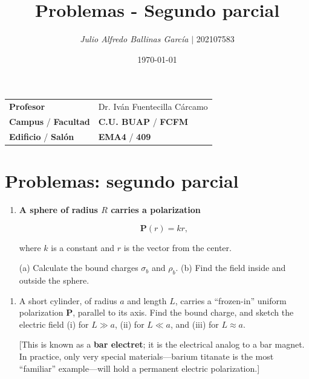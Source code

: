 \documentclass{article}
\title{Problemas  - \textcolor{Tarawera}{\textbf{Segundo parcial}}}
\author{\emph{Julio Alfredo Ballinas García} $\boldsymbol{\mid}$ 202107583}
\date{\today}
\begin{document}
\maketitle



\begin{mybox}
\noindent\begin{tabular}{@{}ll}
	{\bfseries{Profesor}} & Dr. Iván Fuentecilla Cárcamo\\
	\textcolor{prussianblue}{\bfseries{Campus}} / \textcolor{trueblue}{\bfseries{Facultad}}  & \textcolor{prussianblue}{\bfseries{C.U. BUAP}} /  \textcolor{trueblue}{\bfseries{FCFM}} \\
	\textcolor{prussianblue}{\bfseries{Edificio}} /  \textcolor{trueblue}{\bfseries{Salón}}    & 	\textcolor{prussianblue}{\bfseries{EMA4}} /  \textcolor{trueblue}{\bfseries{409}}   
\end{tabular} 
\end{mybox} \vspace{1cm}

\section*{\textcolor{Apple Green}{\textbf{Problemas: segundo parcial}}}

\begin{enumerate}[label={{\textcolor{trueblue}{\textbf{Pr.} \arabic*.1}}}, start=1]
\item \textbf{A sphere of radius $R$ carries a polarization}

\[
\mathbf{P}(r) = k r,
\]

where $k$ is a constant and $r$ is the vector from the center.

(a) Calculate the bound charges $\sigma_{b}$ and $\rho_{b}$.  
(b) Find the field inside and outside the sphere.
\end{enumerate}

\begin{enumerate}[label={{\textcolor{trueblue}{\textbf{Pr.} \arabic*.2}}}]
\item A short cylinder, of radius $a$ and length $L$, carries a ``frozen-in'' uniform polarization $\mathbf{P}$, parallel to its axis. Find the bound charge, and sketch the electric field (i) for $L \gg a$, (ii) for $L \ll a$, and (iii) for $L \approx a$.

[This is known as a \textbf{bar electret}; it is the electrical analog to a bar magnet. In practice, only very special materials—barium titanate is the most “familiar” example—will hold a permanent electric polarization.]
\end{enumerate}
\end{document}
